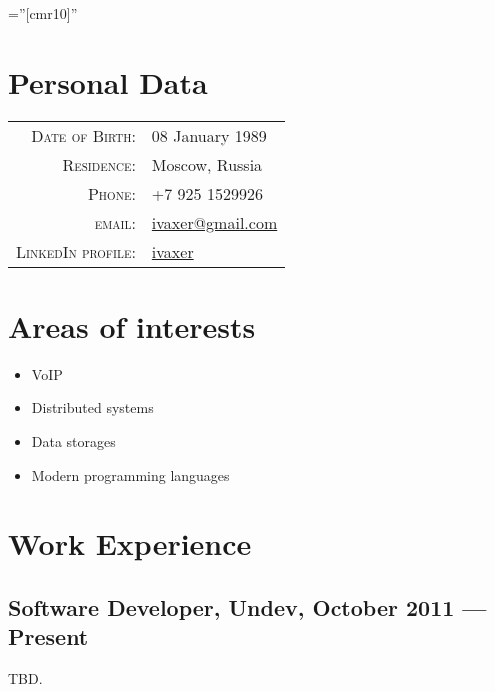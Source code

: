 \documentclass[a4paper,10pt]{article}
\begin{document}
\pagestyle{empty}

\font\fb=''[cmr10]''

\par{\bigskip\par}


\section{Personal Data}

\begin{tabular}{rl}
    \textsc{Date of Birth:} & 08 January 1989\\
    \textsc{Residence:}   & Moscow, Russia\\
    \textsc{Phone:}     & +7 925 1529926\\
    \textsc{email:}     & \href{mailto:ivaxer@gmail.com}{ivaxer@gmail.com} \\
    \textsc{LinkedIn profile:} & \href{http://www.linkedin.com/in/ivaxer}{ivaxer}
\end{tabular}


\section{Areas of interests}
\begin{itemize}
\item VoIP
\item Distributed systems
\item Data storages
\item Modern programming languages
\end{itemize}


\section{Work Experience}
\subsection{Software Developer, Undev, October 2011 --- Present}
TBD.
\end{document}
